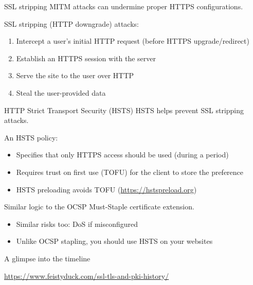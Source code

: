 \begin{frame}{SSL stripping}
  MITM attacks can undermine proper HTTPS configurations.

  \vspace*{1em}

  \pause
  SSL stripping (HTTP downgrade) attacks:
  \begin{enumerate}[<+(1)->]
    \item Intercept a user's initial HTTP request (before HTTPS upgrade/redirect)
    \item Establish an HTTPS session with the server
    \item Serve the site to the user over HTTP
    \item Steal the user-provided data
  \end{enumerate}
\end{frame}

\begin{frame}{HTTP Strict Transport Security (HSTS)}
  HSTS helps prevent SSL stripping attacks.

  \pause
  An HSTS policy:
  \begin{itemize}[<+(1)->]
    \item Specifies that only HTTPS access should be used (during a period)
    \item Requires trust on first use (TOFU) for the client to store the preference
    \item HSTS preloading avoids TOFU ({\small\url{https://hstspreload.org}})
  \end{itemize}

  \vspace*{1em}

  \pause
  Similar logic to the OCSP Must-Staple certificate extension.
  \begin{itemize}[<+(1)->]
    \item Similar risks too: DoS if misconfigured
    \item Unlike OCSP stapling, you should use HSTS on your websites
  \end{itemize}
\end{frame}

\begin{frame}{A glimpse into the timeline}
  \begin{center}
    \url{https://www.feistyduck.com/ssl-tls-and-pki-history/}
  \end{center}
\end{frame}


